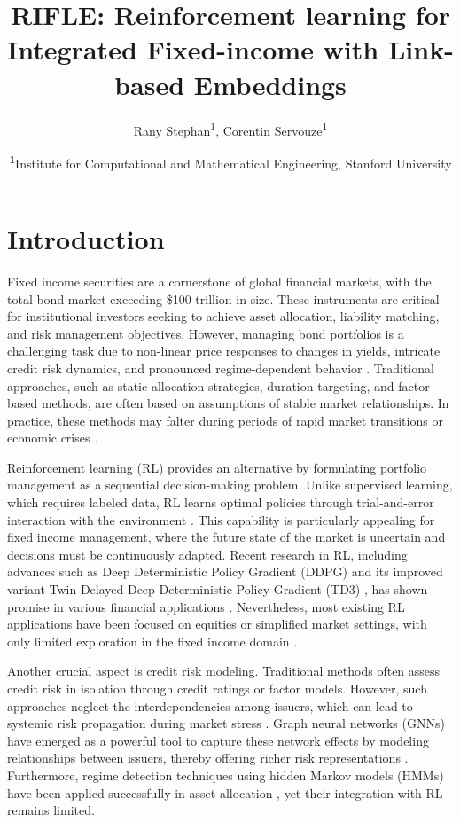 \documentclass[
  a4paper,
  10pt,
  unnumberedsections,
  twoside,
]{LTJournalArticle}
\title{RIFLE: Reinforcement learning for Integrated Fixed-income with Link-based Embeddings}
\author{%
  Rany Stephan\textsuperscript{1}, Corentin Servouze\textsuperscript{1}
}
\date{\footnotesize\textsuperscript{\textbf{1}}Institute for Computational and Mathematical Engineering, Stanford University}
\begin{document}
\maketitle

\section{Introduction}
Fixed income securities are a cornerstone of global financial markets, with the total bond market exceeding \$100 trillion in size. These instruments are critical for institutional investors seeking to achieve asset allocation, liability matching, and risk management objectives. However, managing bond portfolios is a challenging task due to non-linear price responses to changes in yields, intricate credit risk dynamics, and pronounced regime-dependent behavior \cite{grbac2015, bansal2002}. Traditional approaches, such as static allocation strategies, duration targeting, and factor-based methods, are often based on assumptions of stable market relationships. In practice, these methods may falter during periods of rapid market transitions or economic crises \cite{glasserman2016, guidolin2011}.

Reinforcement learning (RL) provides an alternative by formulating portfolio management as a sequential decision-making problem. Unlike supervised learning, which requires labeled data, RL learns optimal policies through trial-and-error interaction with the environment \cite{sutton2018}. This capability is particularly appealing for fixed income management, where the future state of the market is uncertain and decisions must be continuously adapted. Recent research in RL, including advances such as Deep Deterministic Policy Gradient (DDPG) and its improved variant Twin Delayed Deep Deterministic Policy Gradient (TD3) \cite{fujimoto2018}, has shown promise in various financial applications \cite{jiang2017, yu2019}. Nevertheless, most existing RL applications have been focused on equities or simplified market settings, with only limited exploration in the fixed income domain \cite{kolm2019, kalayci2021}.

Another crucial aspect is credit risk modeling. Traditional methods often assess credit risk in isolation through credit ratings or factor models. However, such approaches neglect the interdependencies among issuers, which can lead to systemic risk propagation during market stress \cite{weber2019}. Graph neural networks (GNNs) have emerged as a powerful tool to capture these network effects by modeling relationships between issuers, thereby offering richer risk representations \cite{cheng2021, li2020}. Furthermore, regime detection techniques using hidden Markov models (HMMs) have been applied successfully in asset allocation \cite{hamilton1989, ang2002}, yet their integration with RL remains limited.
\end{document}
